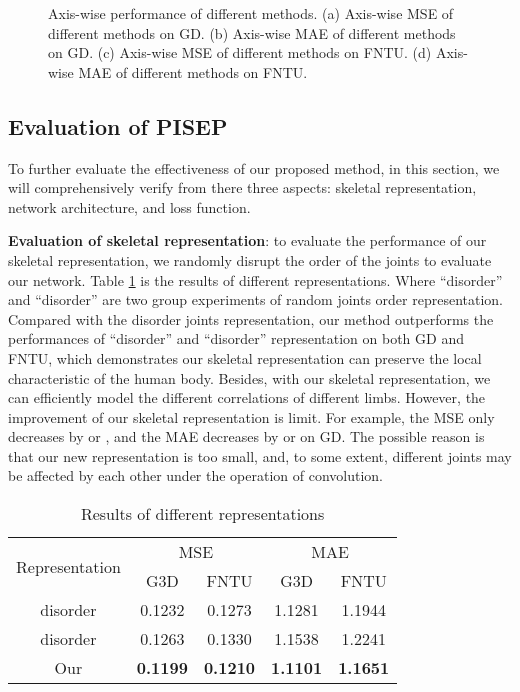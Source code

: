 \documentclass[journal]{IEEEtran}
\begin{document}
\begin{figure}[!t]
\centering
{}
\hfil
{}
\hfil
{}
\hfil
{}
\caption{Axis-wise performance of different methods. (a) Axis-wise MSE of different methods on GD. (b) Axis-wise MAE of different methods on GD. (c) Axis-wise MSE of different methods on FNTU. (d) Axis-wise MAE of different methods on FNTU. }
\label{fig8}
\end{figure}

\subsection{Evaluation of PISEP}
To further evaluate the effectiveness of our proposed method, in this section, we will comprehensively verify from there three aspects: skeletal representation, network architecture, and loss function.

{\bf Evaluation of skeletal representation}: to evaluate the performance of our skeletal representation, we randomly disrupt the order of the joints to evaluate our network. Table \ref{table2} is the results of different representations. Where ``disorder'' and ``disorder'' are two group experiments of random joints order representation. Compared with the disorder joints representation, our method outperforms the performances of ``disorder'' and ``disorder'' representation on both GD and FNTU, which demonstrates our skeletal representation can preserve the local characteristic of the human body. Besides, with our skeletal representation, we can efficiently model the different correlations of different limbs. However, the improvement of our skeletal representation is limit. For example, the MSE only decreases by  or , and the MAE decreases by  or  on GD. The possible reason is that our new representation is too small, and, to some extent, different joints may be affected by each other under the operation of convolution.

\begin{table}[!t]
\renewcommand{\arraystretch}{1.3}
\caption{Results of different representations}
\label{table2}
\centering
\begin{tabular}{ccccc}
\hline
\multirow{2}{*}{Representation}& \multicolumn{2}{c}{MSE} & \multicolumn{2}{c}{MAE} \\
 \cline{2-5}& G3D &FNTU & G3D &FNTU \\
\hline
disorder&0.1232&0.1273&1.1281&1.1944 \\
disorder&0.1263&0.1330&1.1538&1.2241 \\
Our&{\bf 0.1199}&{\bf 0.1210}&{\bf 1.1101}&{\bf 1.1651} \\
\hline
\end{tabular}
\end{table}
\end{document}
